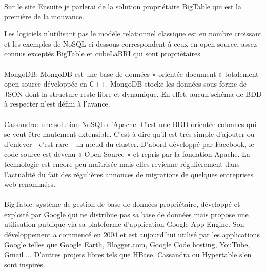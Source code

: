Sur le site \url{} Ensuite je parlerai de la solution
propriétaire \textsf{BigTable} qui est la première de la mouvance.

Les logiciels n'utilisant pas le modèle relationnel classique est en
nombre croissant et les exemples de \textsf{NoSQL} ci-dessous
correspondent à ceux en open source, assez connus exceptés
\textsf{BigTable} et \textsf{cubeLaBRI} qui sont propriétaires.
\\
\\ 
{\sf MongoDB}: MongoDB est une base de données « \textsf{orientée
    document} » totalement open-source développée en
\textsf{C++}. MongoDB stocke les données sous forme de \textsf{JSON}
dont la structure reste libre et dynamique.  En effet, aucun schéma de
\textsf{BDD} à respecter n'est défini à
l'avance.\cite{mongoDB} 
\\
\\ 
\textsf{Cassandra}:  une
solution \textsf{NoSQL} d’\textsf{Apache}.  C’est une \textsf{BDD}
orientée colonnes qui se veut être hautement extensible. C’est-à-dire
qu’il est très simple d’ajouter ou d’enlever - c’est rare - un nœud du
cluster. D’abord développé par \textsf{Facebook}, le code source est
devenu « \textsf{Open-Source} » et repris par la
fondation \textsf{Apache}\cite{cassandra}.  La technologie est encore
peu maîtrisée mais elles revienne régulièrement dans l’actualité du
fait des régulières annonces de migrations de quelques
entreprises \textsf{web} renommées\cite{cassandra2}.
\\
\\ 
\textsf{BigTable}:  système de gestion de base de
données propriétaire, développé et exploité par Google qui ne
distribue pas sa base de données mais propose une utilisation publique
via sa plateforme d'application \textsf{Google App Engine}. Son
développement a commencé en $2004$ et est aujourd'hui utilisé par les
applications \textsf{Google} telles que \textsf{Google Earth},
\textsf{Blogger.com}, \textsf{Google Code hosting}, \textsf{YouTube},
\textsf{Gmail} ... D'autres projets libres tels que \textsf{HBase},
\textsf{Cassandra} ou \textsf{Hypertable} s'en sont
inspirés.
